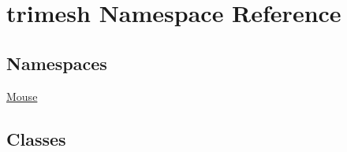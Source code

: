 \hypertarget{namespacetrimesh}{}\section{trimesh Namespace Reference}
\label{namespacetrimesh}
\subsection*{Namespaces}
\begin{DoxyCompactItemize}
\item 
 \hyperlink{namespacetrimesh_1_1Mouse}{Mouse}
\end{DoxyCompactItemize}
\subsection*{Classes}
